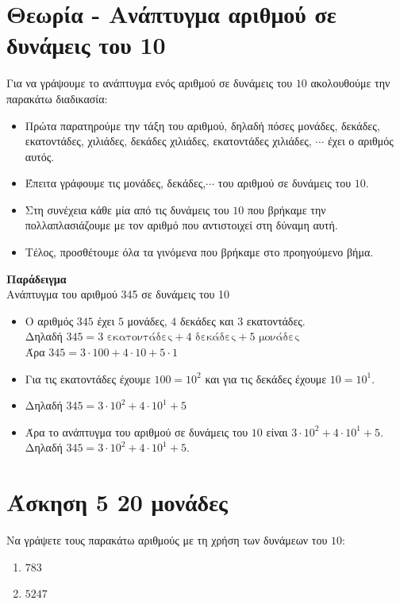 \documentclass[a4paper,10pt]{report}
\begin{document}
\section*{Θεωρία - Ανάπτυγμα αριθμού σε δυνάμεις του 10 \hfill \small{}}
Για να γράψουμε το ανάπτυγμα ενός αριθμού σε δυνάμεις του $10$  ακολουθούμε την παρακάτω διαδικασία:
\begin{itemize}
 \item Πρώτα παρατηρούμε την τάξη του αριθμού, δηλαδή πόσες μονάδες, δεκάδες, εκατοντάδες, χιλιάδες, 
       δεκάδες χιλιάδες, εκατοντάδες χιλιάδες, $\cdots$ έχει ο αριθμός αυτός.
 \item Έπειτα γράφουμε τις μονάδες, δεκάδες,$\cdots$ του αριθμού σε δυνάμεις του $10$.
 \item Στη συνέχεια κάθε μία από τις δυνάμεις του $10$ που βρήκαμε την πολλαπλασιάζουμε με τον αριθμό που 
       αντιστοιχεί στη δύναμη αυτή.
 \item Τέλος, προσθέτουμε όλα τα γινόμενα που βρήκαμε στο προηγούμενο βήμα.
\end{itemize}
\textbf{Παράδειγμα}\\
Ανάπτυγμα του αριθμού 345 σε δυνάμεις του 10
\begin{itemize}
 \item Ο αριθμός $345$ έχει $5$ μονάδες, $4$ δεκάδες και $3$ εκατοντάδες.\\
       Δηλαδή $345=3\text{ εκατοντάδες}+4\text{ δεκάδες}+5\text{ μονάδες}$\\
       Άρα $345=3\cdot 100+4\cdot 10+5\cdot 1$
 \item Για τις εκατοντάδες έχουμε $100=10^{2}$ και για τις δεκάδες έχουμε $10=10^{1}$.
 \item Δηλαδή $345=3\cdot 10^{2}+4\cdot 10^{1}+5$
 \item Άρα το ανάπτυγμα του αριθμού σε δυνάμεις του $10$ είναι $3\cdot10^{2}+4\cdot 10^{1}+5$.\\
       Δηλαδή $345=3\cdot10^{2}+4\cdot 10^{1}+5$.
\end{itemize}


\section*{Άσκηση 5  \hfill \small{}20  μονάδες}
Να γράψετε τους παρακάτω αριθμούς με τη χρήση των δυνάμεων του $10$:
\begin{enumerate}[1)]
 \item $783$
 \item $5247$
\end{enumerate}







\end{document}
